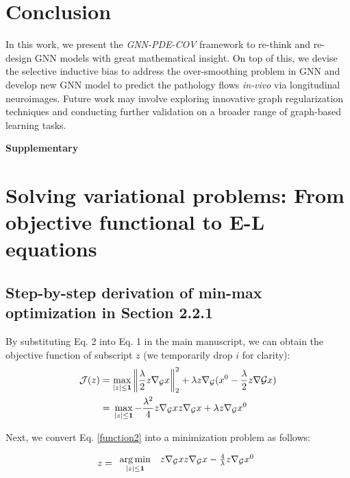 \documentclass{article}
\begin{document}
\section{Conclusion}
In this work, we present the \textit{GNN-PDE-COV} framework to re-think and re-design GNN models with great mathematical insight. On top of this, we devise the selective inductive bias to address the over-smoothing problem in GNN and develop new GNN model to predict the pathology flows \textit{in-vivo} via longitudinal neuroimages. Future work may involve exploring innovative graph regularization techniques and conducting further validation on a broader range of graph-based learning tasks.

\newpage

\begin{center}
  \Large
  \textbf{Supplementary}
\end{center}
\section{Solving variational problems: From objective functional to E-L equations}

\subsection{Step-by-step derivation of min-max optimization in Section 2.2.1}
\label{section5.1}
By substituting Eq. 2 into Eq. 1 in the main manuscript, we can obtain the objective function of subscript $z$ (we temporarily drop $i$ for clarity):
\begin{align}
\label{function1}
{\cal J}({z}) &= \mathop {\max }\limits_{|{z}| \le {\bf{1}}} \left\| {\frac{\lambda }{2}{z}{\nabla _{\cal G}}{x}} \right\|_2^2 + \lambda {z}{\nabla _{\cal G}}(x^0 - \frac{\lambda }{2}{z}{\nabla {\cal G}}{x})\\
&= \begin{aligned}[t]
\label{function2}
&\mathop {\max }\limits_{|{z}| \le {\bf{1}}}- \frac{{{\lambda ^2}}}{4}{z}{\nabla _{\cal G}}{x}{z}{\nabla _{\cal G}}{x} + \lambda {z}{\nabla _{\cal G}}x^0
\end{aligned}
\end{align}

Next, we convert Eq. \ref{function2} into a minimization problem as follows:

\begin{equation}
\label{obj1}
    {z} = \begin{array}{*{20}{c}}
{\mathop {\arg \min }\limits_{|{z}| \le {\bf{1}}} }&{{z}{\nabla _{\cal G}}{x}{z}{\nabla _{\cal G}}{x} - \frac{4}{\lambda }{z}{\nabla _{\cal G}}x^0}
\end{array}
\end{equation}
\end{document}
